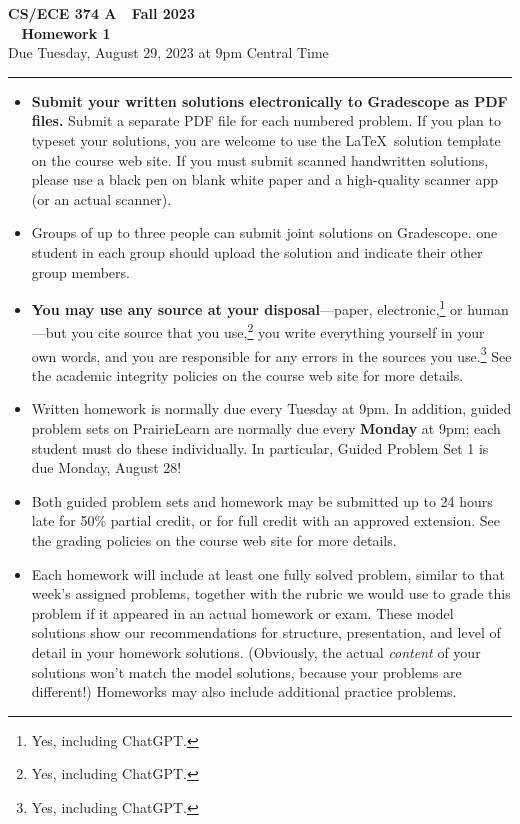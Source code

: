 \documentclass[11pt]{article}
\begin{document}
\thispagestyle{empty}

\begin{center}
\Large\textbf{CS/ECE 374 A \,\decosix\, Fall 2023}%
\\
\LARGE\textbf{\decothreeleft~ Homework 1 ~\decothreeright}%
\\[0.5ex]
\large Due Tuesday, August 29, 2023 at 9pm Central Time
\end{center}

\bigskip
\hrule
\bigskip
\begin{itemize}

\item
\textbf{Submit your written solutions electronically to Gradescope as PDF files.}  Submit a separate PDF file for each numbered problem.  If you plan to typeset your solutions, you are welcome to use the \LaTeX\ solution template on the course web site.  If you must submit scanned handwritten solutions, please use a black pen on blank white paper and a high-quality scanner app (or an actual scanner).

\item
Groups of up to three people can submit joint solutions on Gradescope.   one student in each group should upload the solution and indicate their other group members.

\item
\textbf{You may use any source at your disposal}—paper, electronic,\footnote{Yes, including ChatGPT.} or human—but you  cite  source that you use,\footnote{Yes, including ChatGPT.} you  write everything yourself in your own words, and you are responsible for any errors in the sources you use.\footnote{Yes, including ChatGPT.}  See the academic integrity policies on the course web site for more details. 

\item
Written homework is normally due every Tuesday at 9pm.  In addition, guided problem sets on PrairieLearn are normally due every \textbf{Monday} at 9pm; each student must do these individually.  In particular, Guided Problem Set 1 is due Monday, August 28!  

\item
Both guided problem sets and homework may be submitted up to 24 hours late for 50\% partial credit, or for full credit with an approved extension. See the grading policies on the course web site for more details.

\item
Each homework will include at least one fully solved problem, similar to that week’s   assigned problems, together with the rubric we would use to grade this problem if it appeared in an actual homework or exam.  These model solutions show our recommendations for structure, presentation, and level of detail in your homework solutions.  (Obviously, the actual \emph{content} of your solutions won’t match the model solutions, because your problems are different!)  Homeworks may also include additional practice problems.


\end{itemize}
\end{document}
